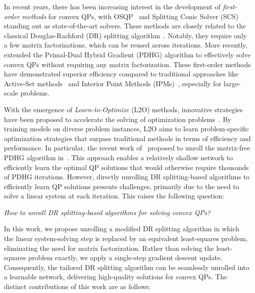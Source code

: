 \documentclass[10pt]{article} %
\begin{document}
In recent years, there has been increasing interest in the development of \textit{first-order methods} for convex QPs, with OSQP~\citep{stellato2020osqp} and Splitting Conic Solver (SCS)~\citep{o2021operator} standing out as state-of-the-art solvers. 
These methods are closely related to the classical Douglas-Rachford (DR) splitting algorithm~\citep{douglas1956numerical}. 
Notably, they require only a few matrix factorizations, which can be reused across iterations.
More recently,~\citet{lu2023pdqp} extended the Primal-Dual Hybrid Gradient (PDHG) algorithm to effectively solve convex QPs without requiring any matrix factorization.
These first-order methods have demonstrated superior efficiency compared to traditional approaches like Active-Set methods~\citep{wolfe1959simplex} and Interior Point Methods (IPMs)~\citep{nesterov1994interior}, especially for large-scale problems. 

With the emergence of \textit{Learn-to-Optimize} (L2O) methods, innovative strategies have been proposed to accelerate the solving of optimization problems~\citep{chen2022learning,gasse2022machine}. 
By training models on diverse problem instances, L2O aims to learn problem-specific optimization strategies that surpass traditional methods in terms of efficiency and performance.
In particular, the recent work of~\citet{yang2024efficient} proposed to unroll the matrix-free PDHG algorithm in~\citet{lu2023pdqp}.
This approach enables a relatively shallow network to efficiently learn the optimal QP solutions that would otherwise require thousands of PDHG iterations.
However, directly unrolling DR splitting-based algorithms to efficiently learn QP solutions presents challenges, primarily due to the need to solve a linear system at each iteration.
This raises the following question:
\begin{center}
    \textit{How to unroll DR splitting-based algorithms for solving convex QPs?}
\end{center}

In this work, we propose unrolling a modified DR splitting algorithm in which the linear system-solving step is replaced by an equivalent least-squares problem, eliminating the need for matrix factorization. 
Rather than solving the least-squares problem exactly, we apply a single-step gradient descent update. 
Consequently, the tailored DR splitting algorithm can be seamlessly unrolled into a learnable network, delivering high-quality solutions for convex QPs.
The distinct contributions of this work are as follows:
\end{document}
